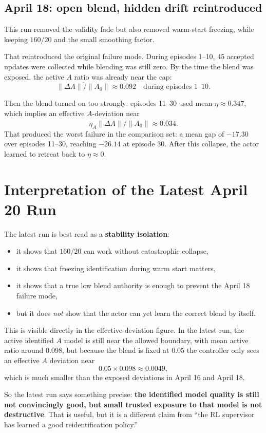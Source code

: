 \documentclass[11pt]{article}
\begin{document}
\subsection*{April 18: open blend, hidden drift reintroduced}
This run removed the validity fade but also removed warm-start freezing, while keeping $160/20$ and the small smoothing factor.

That reintroduced the original failure mode. During episodes 1--10, 45 accepted updates were collected while blending was still zero. By the time the blend was exposed, the active $A$ ratio was already near the cap:
\[
\overline{\lVert \Delta A \rVert/\lVert A_0 \rVert} \approx 0.092 \quad \text{during episodes 1--10.}
\]

Then the blend turned on too strongly: episodes 11--30 used mean $\eta \approx 0.347$, which implies an effective $A$-deviation near
\[
\overline{\eta_A\lVert \Delta A \rVert/\lVert A_0 \rVert} \approx 0.034.
\]
That produced the worst failure in the comparison set: a mean gap of $-17.30$ over episodes 11--30, reaching $-26.14$ at episode 30. After this collapse, the actor learned to retreat back to $\eta \approx 0$.

\section*{Interpretation of the Latest April 20 Run}
The latest run is best read as a \textbf{stability isolation}:
\begin{itemize}
\item it shows that $160/20$ can work without catastrophic collapse,
\item it shows that freezing identification during warm start matters,
\item it shows that a true low blend authority is enough to prevent the April 18 failure mode,
\item but it does \emph{not} show that the actor can yet learn the correct blend by itself.
\end{itemize}

This is visible directly in the effective-deviation figure. In the latest run, the active identified $A$ model is still near the allowed boundary, with mean active ratio around 0.098, but because the blend is fixed at 0.05 the controller only sees an effective $A$ deviation near
\[
0.05 \times 0.098 \approx 0.0049,
\]
which is much smaller than the exposed deviations in April 16 and April 18.

So the latest run says something precise: \textbf{the identified model quality is still not convincingly good, but small trusted exposure to that model is not destructive}. That is useful, but it is a different claim from ``the RL supervisor has learned a good reidentification policy.''
\end{document}

